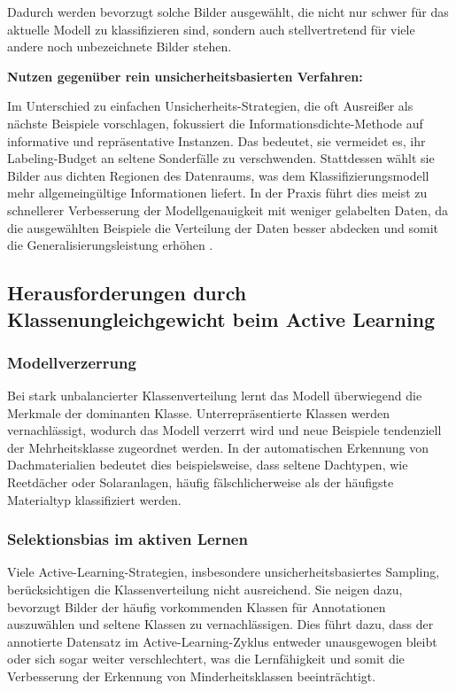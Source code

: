 \documentclass{article}
\begin{document}
	Dadurch werden bevorzugt solche Bilder ausgewählt, die nicht nur schwer für das aktuelle Modell zu klassifizieren sind, sondern auch stellvertretend für viele andere noch unbezeichnete Bilder stehen.
	
	\textbf{Nutzen gegenüber rein unsicherheitsbasierten Verfahren:}
	
	Im Unterschied zu einfachen Unsicherheits-Strategien, die oft Ausreißer als nächste Beispiele vorschlagen, fokussiert die Informationsdichte-Methode auf informative und repräsentative Instanzen. Das bedeutet, sie vermeidet es, ihr Labeling-Budget an seltene Sonderfälle zu verschwenden. Stattdessen wählt sie Bilder aus dichten Regionen des Datenraums, was dem Klassifizierungsmodell mehr allgemeingültige Informationen liefert. In der Praxis führt dies meist zu schnellerer Verbesserung der Modellgenauigkeit mit weniger gelabelten Daten, da die ausgewählten Beispiele die Verteilung der Daten besser abdecken und somit die Generalisierungsleistung erhöhen \cite{Gu2015}.
	
	\subsection{Herausforderungen durch Klassenungleichgewicht beim Active Learning}
	
	\subsubsection{Modellverzerrung}
	Bei stark unbalancierter Klassenverteilung lernt das Modell überwiegend die Merkmale der dominanten Klasse. Unterrepräsentierte Klassen werden vernachlässigt, wodurch das Modell verzerrt wird und neue Beispiele tendenziell der Mehrheitsklasse zugeordnet werden. In der automatischen Erkennung von Dachmaterialien bedeutet dies beispielsweise, dass seltene Dachtypen, wie Reetdächer oder Solaranlagen, häufig fälschlicherweise als der häufigste Materialtyp klassifiziert werden\cite{Jin2022}.
	
	\subsubsection{Selektionsbias im aktiven Lernen}
	Viele Active-Learning-Strategien, insbesondere unsicherheitsbasiertes Sampling, berücksichtigen die Klassenverteilung nicht ausreichend. Sie neigen dazu, bevorzugt Bilder der häufig vorkommenden Klassen für Annotationen auszuwählen und seltene Klassen zu vernachlässigen. Dies führt dazu, dass der annotierte Datensatz im Active-Learning-Zyklus entweder unausgewogen bleibt oder sich sogar weiter verschlechtert, was die Lernfähigkeit und somit die Verbesserung der Erkennung von Minderheitsklassen beeinträchtigt\cite{Jin2022}.
	
\end{document}
